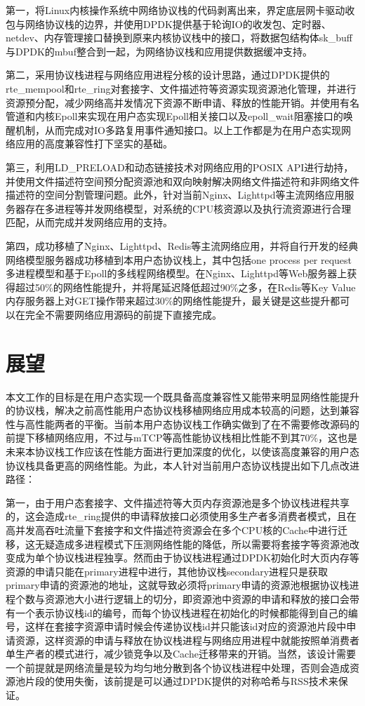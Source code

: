 第一，将Linux内核操作系统中网络协议栈的代码剥离出来，界定底层网卡驱动收包与网络协议栈的边界，并使用DPDK提供基于轮询IO的收发包、定时器、netdev、内存管理接口替换到原来内核协议栈中的接口，将数据包结构体sk\_buff与DPDK的mbuf整合到一起，为网络协议栈和应用提供数据缓冲支持。

第二，采用协议栈进程与网络应用进程分核的设计思路，通过DPDK提供的rte\_mempool和rte\_ring对套接字、文件描述符等资源实现资源池化管理，并进行资源预分配，减少网络高并发情况下资源不断申请、释放的性能开销。并使用有名管道和内核Epoll来实现在用户态实现Epoll相关接口以及epoll\_wait阻塞接口的唤醒机制，从而完成对IO多路复用事件通知接口。以上工作都是为在用户态实现网络应用的高度兼容性打下坚实的基础。

第三，利用LD\_PRELOAD和动态链接技术对网络应用的POSIX API进行劫持，并使用文件描述符空间预分配资源池和双向映射解决网络文件描述符和非网络文件描述符的空间分割管理问题。此外，针对当前Nginx、Lighttpd等主流网络应用服务器存在多进程等并发网络模型，对系统的CPU核资源以及执行流资源进行合理匹配，从而完成并发网络应用的支持。

第四，成功移植了Nginx、Lighttpd、Redis等主流网络应用，并将自行开发的经典网络模型服务器成功移植到本用户态协议栈上，其中包括one process per request多进程模型和基于Epoll的多线程网络模型。在Nginx、Lighttpd等Web服务器上获得超过50\%的网络性能提升，并将尾延迟降低超过90\%之多，在Redis等Key Value内存服务器上对GET操作带来超过30\%的网络性能提升，最关键是这些提升都可以在完全不需要网络应用源码的前提下直接完成。

\section{展望}

本文工作的目标是在用户态实现一个既具备高度兼容性又能带来明显网络性能提升的协议栈，解决之前高性能用户态协议栈移植网络应用成本较高的问题，达到兼容性与高性能两者的平衡。当前本用户态协议栈工作确实做到了在不需要修改源码的前提下移植网络应用，不过与mTCP等高性能协议栈相比性能不到其70\%，这也是未来本协议栈工作应该在性能方面进行更加深度的优化，以使该高度兼容的用户态协议栈具备更高的网络性能。为此，本人针对当前用户态协议栈提出如下几点改进路径：

第一，由于用户态套接字、文件描述符等大页内存资源池是多个协议栈进程共享的，这会造成rte\_ring提供的申请释放接口必须使用多生产者多消费者模式，且在高并发高吞吐流量下套接字和文件描述符资源会在多个CPU核的Cache中进行迁移，这无疑造成多进程模式下压测网络性能的降低，所以需要将套接字等资源池改变成为单个协议栈进程独享。然而由于协议栈进程通过DPDK初始化时大页内存等资源的申请只能在primary进程中进行，其他协议栈secondary进程只是获取primary申请的资源池的地址，这就导致必须将primary申请的资源池根据协议栈进程个数与资源池大小进行逻辑上的切分，即资源池中资源的申请和释放的接口会带有一个表示协议栈id的编号，而每个协议栈进程在初始化的时候都能得到自己的编号，这样在套接字资源申请时候会传递协议栈id并只能该id对应的资源池片段中申请资源，这样资源的申请与释放在协议栈进程与网络应用进程中就能按照单消费者单生产者的模式进行，减少锁竞争以及Cache迁移带来的开销。当然，该设计需要一个前提就是网络流量是较为均匀地分散到各个协议栈进程中处理，否则会造成资源池片段的使用失衡，该前提是可以通过DPDK提供的对称哈希与RSS技术来保证。

